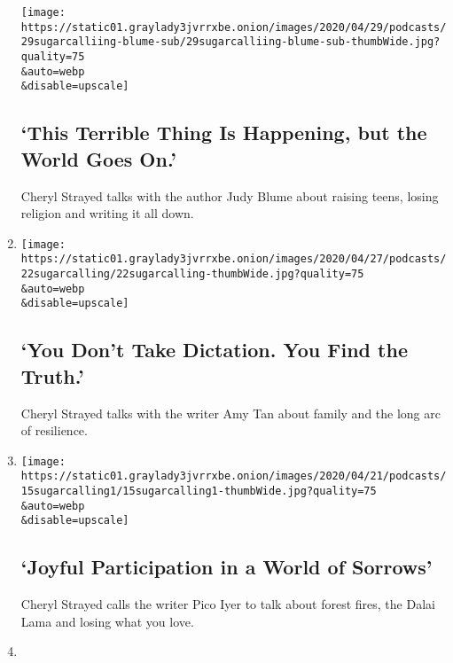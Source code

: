 \begin{enumerate}
  \texttt{[image: https://static01.graylady3jvrrxbe.onion/images/2020/04/29/podcasts/29sugarcalliing-blume-sub/29sugarcalliing-blume-sub-thumbWide.jpg?quality=75\\\&auto=webp\\\&disable=upscale]}

  \hypertarget{this-terrible-thing-is-happening-but-the-world-goes-on}{%
  \subsection{`This Terrible Thing Is Happening, but the World Goes
  On.'}\label{this-terrible-thing-is-happening-but-the-world-goes-on}}

  Cheryl Strayed talks with the author Judy Blume about raising teens,
  losing religion and writing it all down.
\item
  \href{/2020/04/22/podcasts/sugar-calling-amy-tan-quarantine-virus.html}{}

  \texttt{[image: https://static01.graylady3jvrrxbe.onion/images/2020/04/27/podcasts/22sugarcalling/22sugarcalling-thumbWide.jpg?quality=75\\\&auto=webp\\\&disable=upscale]}

  \hypertarget{you-dont-take-dictation-you-find-the-truth}{%
  \subsection{`You Don't Take Dictation. You Find the
  Truth.'}\label{you-dont-take-dictation-you-find-the-truth}}

  Cheryl Strayed talks with the writer Amy Tan about family and the long
  arc of resilience.
\item
  \href{/2020/04/15/podcasts/sugar-calling-pico-iyer-coronavirus.html}{}

  \texttt{[image: https://static01.graylady3jvrrxbe.onion/images/2020/04/21/podcasts/15sugarcalling1/15sugarcalling1-thumbWide.jpg?quality=75\\\&auto=webp\\\&disable=upscale]}

  \hypertarget{joyful-participation-in-a-world-of-sorrows}{%
  \subsection{`Joyful Participation in a World of
  Sorrows'}\label{joyful-participation-in-a-world-of-sorrows}}

  Cheryl Strayed calls the writer Pico Iyer to talk about forest fires,
  the Dalai Lama and losing what you love.
\item
  \href{/2020/04/08/podcasts/sugar-calling-margaret-atwood-coronavirus.html}{}


\end{enumerate}
